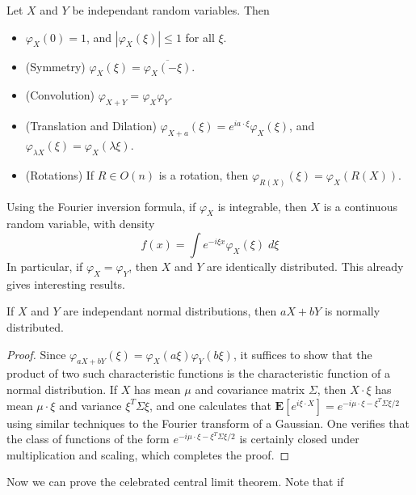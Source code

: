 \begin{lemma}
    Let $X$ and $Y$ be independant random variables. Then
    \begin{itemize}
        \item $\varphi_X(0) = 1$, and $|\varphi_X(\xi)| \leq 1$ for all $\xi$.

        \item (Symmetry) $\varphi_X(\xi) = \overline{\varphi_X(-\xi)}$.

        \item (Convolution) $\varphi_{X+Y} = \varphi_X \varphi_Y$.

        \item (Translation and Dilation) $\varphi_{X+a}(\xi) = e^{i a \cdot \xi} \varphi_X(\xi)$, and $\varphi_{\lambda X}(\xi) = \varphi_X(\lambda \xi)$.

        \item (Rotations) If $R \in O(n)$ is a rotation, then $\varphi_{R(X)}(\xi) = \varphi_X(R(X))$.
    \end{itemize}
\end{lemma}

Using the Fourier inversion formula, if $\varphi_X$ is integrable, then $X$ is a continuous random variable, with density
%
\[ f(x) = \int e^{- i \xi x} \varphi_X(\xi)\; d\xi \]
%
In particular, if $\varphi_X = \varphi_Y$, then $X$ and $Y$ are identically distributed. This already gives interesting results.

\begin{theorem}
    If $X$ and $Y$ are independant normal distributions, then $aX + bY$ is normally distributed.
\end{theorem}
\begin{proof}
    Since $\varphi_{aX+bY}(\xi) = \varphi_X(a \xi) \varphi_Y(b \xi)$, it suffices to show that the product of two such characteristic functions is the characteristic function of a normal distribution. If $X$ has mean $\mu$ and covariance matrix $\Sigma$, then $X \cdot \xi$ has mean $\mu \cdot \xi$ and variance $\xi^T \Sigma \xi$, and one calculates that $\mathbf{E}[e^{i \xi \cdot X}] = e^{- i \mu \cdot \xi - \xi^T \Sigma \xi / 2}$ using similar techniques to the Fourier transform of a Gaussian. One verifies that the class of functions of the form $e^{-i \mu \cdot \xi - \xi^T \Sigma \xi / 2}$ is certainly closed under multiplication and scaling, which completes the proof. 
\end{proof}

Now we can prove the celebrated central limit theorem. Note that if

